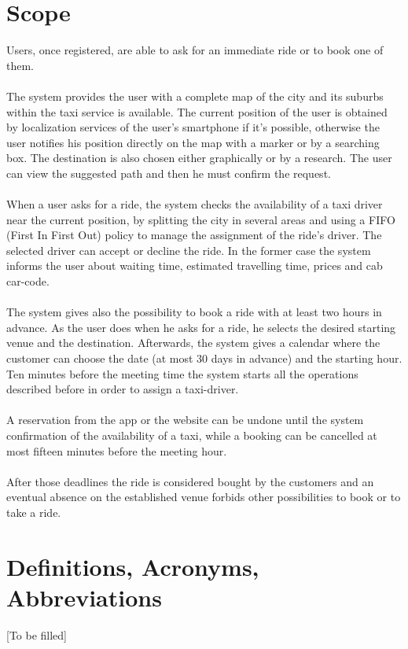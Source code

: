 \documentclass[\mainpath/main]{subfiles}
\begin{document}
\section{Scope}
Users, once registered, are able to ask for an immediate ride or to book one of them.\\
\\
The system provides the user with a complete map of the city and its suburbs within the taxi service is available. The current position of the user is obtained by localization services of the user's smartphone if it's possible, otherwise the user notifies his position directly on the map with a marker or by a searching box. The destination is also chosen either graphically or by a research. The user can view the suggested path and then he must confirm the request.\\
\\
When a user asks for a ride, the system checks the availability of a taxi driver near the current position, by splitting the city in several areas and using a FIFO (First In First Out) policy to manage the assignment of the ride's driver. The selected driver can accept or decline the ride. In the former case the system informs the user about waiting time, estimated travelling time, prices and cab car-code. \\
\\
The system gives also the possibility to book a ride with at least two hours in advance. As the user does when he asks for a ride, he selects the desired starting venue and the destination. Afterwards, the system gives a calendar where the customer can choose the date (at most 30 days in advance) and the starting hour. Ten minutes before the meeting time the system starts all the operations described before in order to assign a taxi-driver.\\
\\
A reservation from the app or the website can be undone until the system confirmation of the availability of a taxi, while a booking can be cancelled at most fifteen minutes before the meeting hour.\\
\\
After those deadlines the ride is considered bought by the customers and an eventual absence on the established venue forbids other possibilities to book or to take a ride.

\section{Definitions, Acronyms, Abbreviations}
[To be filled]
\end{document}
